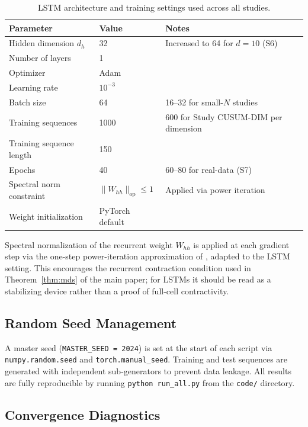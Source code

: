 \documentclass[bj,authoryear]{imsart}
\theoremstyle{plain}
\theoremstyle{definition}
\begin{document}
\begin{table}[h]
\centering
\caption{LSTM architecture and training settings used across all studies.}
\label{tab:hparam}
\small
\begin{tabular}{lll}
\toprule
Parameter & Value & Notes \\
\midrule
Hidden dimension $d_h$ & 32 & Increased to 64 for $d=10$ (S6) \\
Number of layers & 1 & \\
Optimizer & Adam & \citet{kingma2015adam} \\
Learning rate & $10^{-3}$ & \\
Batch size & 64 & 16--32 for small-$N$ studies \\
Training sequences & 1000 & 600 for Study CUSUM-DIM per dimension \\
Training sequence length & 150 & \\
Epochs & 40 & 60--80 for real-data (S7) \\
Spectral norm constraint & $\|W_{hh}\|_{\mathrm{op}} \leq 1$ & Applied via power iteration \\
Weight initialization & PyTorch default & \\
\bottomrule
\end{tabular}
\end{table}

Spectral normalization of the recurrent weight $W_{hh}$ is applied at each
gradient step via the one-step power-iteration approximation of
\citet{miyato2018spectral}, adapted to the LSTM setting.
This encourages the recurrent contraction condition used in
Theorem~\ref{thm:mds} of the main paper; for LSTMs it should be read as a stabilizing device rather than a proof of full-cell contractivity.

\subsection{Random Seed Management}

A master seed (\texttt{MASTER\_SEED = 2024}) is set at the start of each
script via \texttt{numpy.random.seed} and \texttt{torch.manual\_seed}.
Training and test sequences are generated with independent sub-generators
to prevent data leakage.
All results are fully reproducible by running \texttt{python run\_all.py}
from the \texttt{code/} directory.

\subsection{Convergence Diagnostics}
\end{document}

